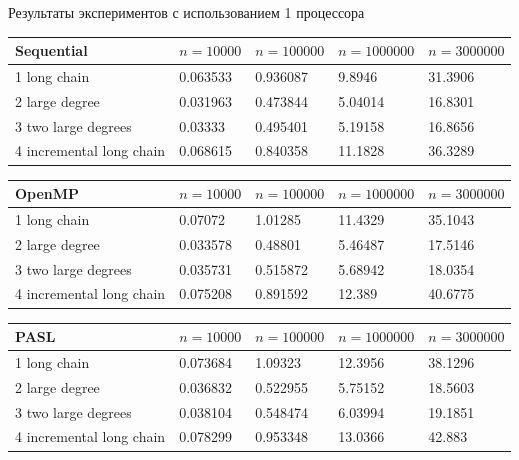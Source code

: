 \documentclass[hyperref=unicode,graphics=pdflatex,13pt]{beamer}
\begin{document}
\begin{frame}[shrink]{Результаты экспериментов с использованием 1 процессора}

\begin{table}[!ht]
\centering
\begin{tabular}{|l|l|l|l|l|}\hline
Sequential	& $n=10000$ & $n=100000$ & $n=1000000$ & $n=3000000$ \\\hline
1 long chain & 0.063533	& 0.936087 & 9.8946 & 31.3906 \\\hline
2 large degree & 0.031963 & 0.473844 & 5.04014 & 16.8301 \\\hline
3 two large degrees & 0.03333 & 0.495401 & 5.19158 & 16.8656 \\\hline
4 incremental long chain & 0.068615 & 0.840358 & 11.1828 & 36.3289 \\\hline
\end{tabular}
\end{table}

\begin{table}[!ht]
\centering
\begin{tabular}{|l|l|l|l|l|}\hline
OpenMP	& $n=10000$ & $n=100000$ & $n=1000000$ & $n=3000000$ \\\hline
1 long chain & 0.07072 & 1.01285 & 11.4329 & 35.1043 \\\hline
2 large degree & 0.033578 & 0.48801 & 5.46487 & 17.5146 \\\hline
3 two large degrees & 0.035731 & 0.515872 & 5.68942 & 18.0354 \\\hline
4 incremental long chain & 0.075208 & 0.891592 & 12.389 & 40.6775 \\\hline
\end{tabular}
\end{table}

\begin{table}[!ht]
\centering
\begin{tabular}{|l|l|l|l|l|}\hline
PASL	& $n=10000$ & $n=100000$ & $n=1000000$ & $n=3000000$ \\\hline
1 long chain & 0.073684	& 1.09323 & 12.3956 & 38.1296 \\\hline
2 large degree & 0.036832 & 0.522955 & 5.75152 & 18.5603 \\\hline
3 two large degrees & 0.038104 & 0.548474 & 6.03994 & 19.1851 \\\hline
4 incremental long chain & 0.078299 & 0.953348 & 13.0366 & 42.883 \\\hline
\end{tabular}
\end{table}
\end{frame}
\end{document}
